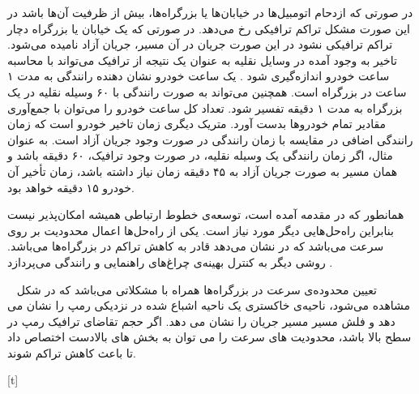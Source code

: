 

در صورتی که ازدحام اتومبیل‌ها در خیابان‌ها یا بزرگراه‌ها، بیش از ظرفیت آن‌ها باشد در این صورت مشکل تراکم ترافیکی رخ می‌دهد. در صورتی که یک خیابان یا بزرگراه دچار تراکم ترافیکی نشود در این صورت جریان در آن مسیر، جریان آزاد نامیده می‌شود.
تاخیر به وجود آمده در وسایل نقلیه به عنوان یک نتیجه از ترافیک می‌تواند با محاسبه ساعت خودرو اندازه‌گیری شود \cite{Jacob2006}. یک ساعت خودرو نشان دهنده رانندگی به مدت ۱ ساعت در بزرگراه است. همچنین می‌تواند به صورت رانندگی با ۶۰ وسیله نقلیه در یک بزرگراه به مدت ۱ دقیقه تفسیر شود. تعداد کل ساعت خودرو را می‌توان با جمع‌آوری مقادیر تمام خودرو‌ها بدست آورد. متریک دیگری زمان تاخیر خودرو است که زمان رانندگی اضافی در مقایسه با زمان رانندگی در صورت وجود جریان آزاد است. به عنوان مثال، اگر زمان رانندگی یک وسیله نقلیه، در صورت وجود ترافیک، ۶۰ دقیقه باشد و همان مسیر به صورت جریان آزاد به ۴۵ دقیقه زمان نیاز داشته باشد، زمان تأخیر آن خودرو ۱۵ دقیقه خواهد بود.

همانطور که در مقدمه آمده است، توسعه‌ی خطوط ارتباطی همیشه امکان‌پذیر نیست  بنابراین راه‌حل‌هایی دیگر مورد نیاز است. یکی از راه‌حل‌ها اعمال محدودیت بر روی سرعت می‌باشد که در \cite{Jacob2006} نشان می‌دهد قادر به کاهش تراکم در بزرگراه‌ها می‌باشد.
روشی دیگر به کنترل بهینه‌ی چراغ‌های راهنمایی و رانندگی می‌پردازد \cite{Wiering2000}.

تعیین محدوده‌ی سرعت در بزرگراه‌ها همراه با مشکلاتی می‌باشد که در شکل ~ مشاهده می‌شود، ناحیه‌ی خاکستری یک ناحیه اشباع شده در نزدیکی رمپ را نشان می دهد و فلش مسیر مسیر جریان را نشان می دهد. اگر حجم تقاضای ترافیک رمپ در سطح بالا باشد، محدودیت های سرعت را می توان به بخش های بالادست اختصاص داد تا باعث کاهش تراکم شوند.

[t]






